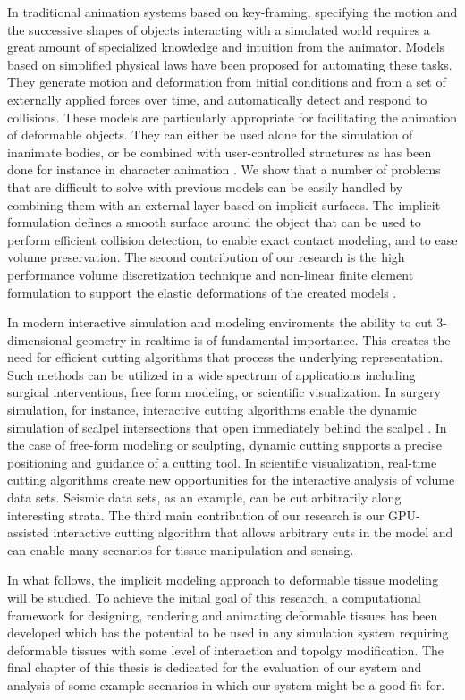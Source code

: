 In traditional animation systems based on key-framing, specifying the motion and the successive shapes of objects interacting with a simulated 
world requires a great amount of specialized knowledge and intuition from the animator. Models based on simplified physical laws have been 
proposed for automating these tasks. They generate motion and deformation from initial conditions and from a set of externally applied forces 
over time, and automatically detect and respond to collisions. These models are particularly appropriate for facilitating the animation of 
deformable objects. They can either be used alone for the simulation of inanimate bodies, or be combined with user-controlled structures as 
has been done for instance in character animation \cite{chadwick1989layered,miller1988motion}. We show that a number of problems that are difficult
to solve with previous models can be easily handled by combining them with an external layer based on implicit surfaces. The implicit formulation
defines a smooth surface around the object that can be used to perform efficient collision detection, to enable exact contact modeling, and to ease
volume preservation. The second contribution of our research is the high performance volume discretization technique and non-linear finite element 
formulation to support the elastic deformations of the created models \cite{Shirazian2013}. 

In modern interactive simulation and modeling enviroments the ability to cut 3-dimensional geometry in realtime is of fundamental importance. 
This creates the need for efficient cutting algorithms that process the underlying representation. Such methods can be utilized in a wide spectrum 
of applications including surgical interventions, free form modeling, or scientific visualization. In surgery simulation, for instance, interactive 
cutting algorithms enable the dynamic simulation of scalpel intersections that open immediately behind the scalpel \cite{Nienhuys2001}. In the 
case of free-form modeling or sculpting, dynamic cutting supports a precise positioning and guidance of a cutting tool. In scientific visualization, 
real-time cutting algorithms create new opportunities for the interactive analysis of volume data sets. Seismic data sets, as an example, can be 
cut arbitrarily along interesting strata. The third main contribution of our research is our GPU-assisted interactive cutting algorithm that allows
arbitrary cuts in the model and can enable many scenarios for tissue manipulation and sensing. 

In what follows, the implicit modeling approach to deformable tissue modeling will be studied. To achieve the initial goal of this research, a
computational framework for designing, rendering and animating deformable tissues has been developed which has the potential to be used in any 
simulation system requiring deformable tissues with some level of interaction and topolgy modification. The final chapter of this thesis is dedicated
for the evaluation of our system and analysis of some example scenarios in which our system might be a good fit for. 


